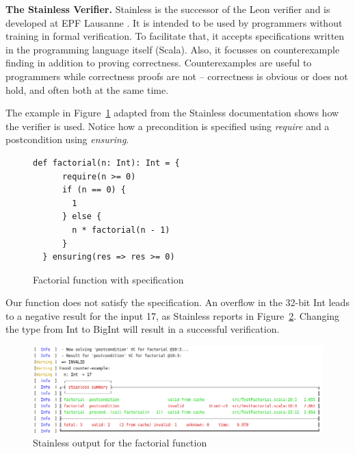\documentclass[runningheads]{llncs}
\renewcommand{\paragraph}{\textbf}%
\begin{document}
\paragraph{The Stainless Verifier.} Stainless is the successor of the
Leon verifier
\cite{DBLP:conf/ecoop/BlancKKS13,DBLP:conf/pldi/VoirolKK15,DBLP:conf/pldi/BlancK15}
and is developed at EPF Lausanne \cite{Stainless:github}. It is
intended to be used by programmers without training in formal
verification. To facilitate that, it accepts specifications written in
the programming language itself (Scala). Also, it focusses on
counterexample finding in addition to proving
correctness. Counterexamples are useful to programmers while
correctness proofs are not -- correctness is obvious or does not hold,
and often both at the same time.

The example in Figure~\ref{fig:factorial} adapted from the Stainless
documentation \cite{Stainless:documentation} shows how the verifier is
used. Notice how a precondition is specified using \emph{require} and
a postcondition using \emph{ensuring}.

\begin{figure}
\begin{lstlisting}[style=scala]
  def factorial(n: Int): Int = {
      require(n >= 0)
      if (n == 0) {
        1
      } else {
        n * factorial(n - 1)
      }
  } ensuring(res => res >= 0)
\end{lstlisting}
	\caption{Factorial function with specification}
	\label{fig:factorial}
\end{figure}
Our function does not satisfy the specification. An overflow in the
32-bit Int leads to a negative result for the input 17, as Stainless
reports in Figure~\ref{fig:failed}. Changing the type from Int to
BigInt will result in a successful verification.

\begin{figure}
	\centering
		\includegraphics[width=\textwidth]{output1.png}
	\caption{Stainless output for the factorial function}
	\label{fig:failed}
\end{figure}
\end{document}
